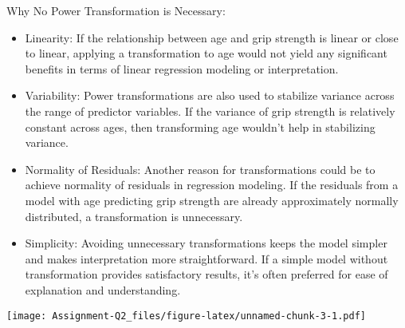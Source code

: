 \documentclass[
]{article}
\newenvironment{Shaded}{\begin{snugshade}}{\end{snugshade}}
\newcommand{\AttributeTok}[1]{\textcolor[rgb]{0.13,0.29,0.53}{#1}}
\newcommand{\CommentTok}[1]{\textcolor[rgb]{0.56,0.35,0.01}{\textit{#1}}}
\newcommand{\DecValTok}[1]{\textcolor[rgb]{0.00,0.00,0.81}{#1}}
\newcommand{\FunctionTok}[1]{\textcolor[rgb]{0.13,0.29,0.53}{\textbf{#1}}}
\newcommand{\NormalTok}[1]{#1}
\newcommand{\SpecialCharTok}[1]{\textcolor[rgb]{0.81,0.36,0.00}{\textbf{#1}}}
\newcommand{\StringTok}[1]{\textcolor[rgb]{0.31,0.60,0.02}{#1}}
\begin{document}
Why No Power Transformation is Necessary:

\begin{itemize}
\item
  Linearity: If the relationship between age and grip strength is linear
  or close to linear, applying a transformation to age would not yield
  any significant benefits in terms of linear regression modeling or
  interpretation.
\item
  Variability: Power transformations are also used to stabilize variance
  across the range of predictor variables. If the variance of grip
  strength is relatively constant across ages, then transforming age
  wouldn't help in stabilizing variance.
\item
  Normality of Residuals: Another reason for transformations could be to
  achieve normality of residuals in regression modeling. If the
  residuals from a model with age predicting grip strength are already
  approximately normally distributed, a transformation is unnecessary.
\item
  Simplicity: Avoiding unnecessary transformations keeps the model
  simpler and makes interpretation more straightforward. If a simple
  model without transformation provides satisfactory results, it's often
  preferred for ease of explanation and understanding.
\end{itemize}

\begin{Shaded}
\end{Shaded}

\texttt{[image: Assignment-Q2\_files/figure-latex/unnamed-chunk-3-1.pdf]}
\end{document}
